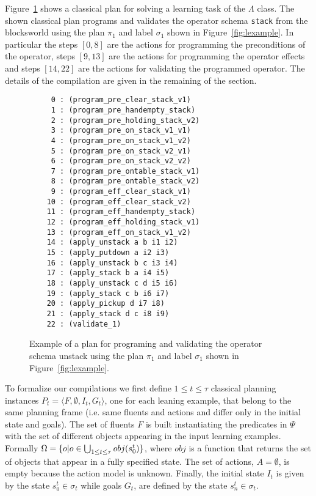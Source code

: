 \documentclass[letterpaper]{article} %
\newcommand{\tup}[1]{{\langle #1 \rangle}}
\begin{document}
Figure~\ref{fig:plan} shows a classical plan for solving a learning task of the $\Lambda$ class. The shown classical plan programs and validates the operator schema {\tt\small stack} from the blocksworld using the plan $\pi_1$ and label $\sigma_1$ shown in Figure~\ref{fig:lexample}. In particular the steps $[0,8]$ are the actions for programming the preconditions of the operator, steps $[9,13]$ are the actions for programming the operator effects and steps $[14,22]$ are the actions for validating the programmed operator. The details of the compilation are given in the remaining of the section.

\begin{figure}[hbt]
\begin{scriptsize}
\begin{verbatim}
     0 : (program_pre_clear_stack_v1)
     1 : (program_pre_handempty_stack)
     2 : (program_pre_holding_stack_v2)
     3 : (program_pre_on_stack_v1_v1)
     4 : (program_pre_on_stack_v1_v2)
     5 : (program_pre_on_stack_v2_v1)
     6 : (program_pre_on_stack_v2_v2)
     7 : (program_pre_ontable_stack_v1)
     8 : (program_pre_ontable_stack_v2)
     9 : (program_eff_clear_stack_v1)
    10 : (program_eff_clear_stack_v2)
    11 : (program_eff_handempty_stack)
    12 : (program_eff_holding_stack_v1)
    13 : (program_eff_on_stack_v1_v2)
    14 : (apply_unstack a b i1 i2)
    15 : (apply_putdown a i2 i3)
    16 : (apply_unstack b c i3 i4)
    17 : (apply_stack b a i4 i5)
    18 : (apply_unstack c d i5 i6)
    19 : (apply_stack c b i6 i7)
    20 : (apply_pickup d i7 i8)
    21 : (apply_stack d c i8 i9)
    22 : (validate_1)
\end{verbatim}
\end{scriptsize}
 \caption{\small Example of a plan for programing and validating the operator schema unstack using the plan $\pi_1$ and label $\sigma_1$ shown in Figure~\ref{fig:lexample}.}
\label{fig:plan}
\end{figure}

To formalize our compilations we first define {\small $1\leq t\leq \tau$} classical planning instances $P_t=\tup{F,\emptyset,I_t,G_t}$, one for each leaning example, that belong to the same planning frame (i.e. same fluents and actions and differ only in the initial state and goals). The set of fluents $F$ is built instantiating the predicates in $\Psi$ with the set of different objects appearing in the input learning examples. Formally $\Omega=\{o|o\in \bigcup_{\small 1\leq t\leq \tau} obj(s_0^t)\}$, where $obj$ is a function that returns the set of objects that appear in a fully specified state. The set of actions, $A=\emptyset$, is empty because the action model is unknown. Finally, the initial state $I_t$ is given by the state $s_0^t\in \sigma_t$ while goals $G_t$, are defined by the state $s_n^t\in \sigma_t$. 
\end{document}
